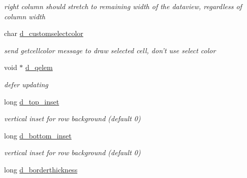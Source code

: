 \begin{DoxyCompactItemize}
\begin{DoxyCompactList}\small\item\em right column should stretch to remaining width of the dataview, regardless of column width \item\end{DoxyCompactList}\item 
\hypertarget{structt__jdataview_a0a92adf0e7f4fb1b90b94b10e21a9c6e}{
char \hyperlink{structt__jdataview_a0a92adf0e7f4fb1b90b94b10e21a9c6e}{d\_\-customselectcolor}}
\label{structt__jdataview_a0a92adf0e7f4fb1b90b94b10e21a9c6e}

\begin{DoxyCompactList}\small\item\em send getcellcolor message to draw selected cell, don't use select color \item\end{DoxyCompactList}\item 
\hypertarget{structt__jdataview_ad54c8116bfca476f9b957a5fb0eb159f}{
void $\ast$ \hyperlink{structt__jdataview_ad54c8116bfca476f9b957a5fb0eb159f}{d\_\-qelem}}
\label{structt__jdataview_ad54c8116bfca476f9b957a5fb0eb159f}

\begin{DoxyCompactList}\small\item\em defer updating \item\end{DoxyCompactList}\item 
\hypertarget{structt__jdataview_a982eb026230833529a16c7e8d1ad277f}{
long \hyperlink{structt__jdataview_a982eb026230833529a16c7e8d1ad277f}{d\_\-top\_\-inset}}
\label{structt__jdataview_a982eb026230833529a16c7e8d1ad277f}

\begin{DoxyCompactList}\small\item\em vertical inset for row background (default 0) \item\end{DoxyCompactList}\item 
\hypertarget{structt__jdataview_a9746791cd2aefd8e85dc80008b6c9aef}{
long \hyperlink{structt__jdataview_a9746791cd2aefd8e85dc80008b6c9aef}{d\_\-bottom\_\-inset}}
\label{structt__jdataview_a9746791cd2aefd8e85dc80008b6c9aef}

\begin{DoxyCompactList}\small\item\em vertical inset for row background (default 0) \item\end{DoxyCompactList}\item 
\hypertarget{structt__jdataview_a0902ab6464260311d0710f41c13f89c5}{
long \hyperlink{structt__jdataview_a0902ab6464260311d0710f41c13f89c5}{d\_\-borderthickness}}
\label{structt__jdataview_a0902ab6464260311d0710f41c13f89c5}


\end{DoxyCompactItemize}
